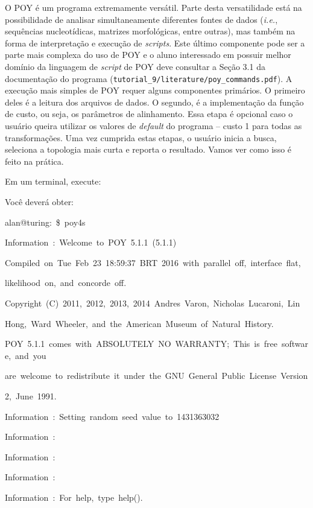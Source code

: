 \begin{refsection}
O POY é um programa extremamente versátil. Parte desta versatilidade está na possibilidade de analisar simultaneamente diferentes fontes de dados (\textit{i.e.}, sequências nucleotídicas, matrizes morfológicas, entre outras), mas também na forma de interpretação e execução de \textit{scripts}. Este último componente pode ser a parte mais complexa do uso de POY e o aluno interessado em possuir melhor domínio da linguagem de \textit{script} de POY deve consultar a Seção 3.1 da documentação do programa (\texttt{tutorial\_9/literature/poy\_commands.pdf}). A execução mais simples de POY requer alguns componentes primários. O primeiro deles é a leitura dos arquivos de dados. O segundo, é a implementação da função de custo, ou seja, os parâmetros de alinhamento. Essa etapa é opcional caso o usuário queira utilizar os valores de \textit{default} do programa -- custo 1 para todas as transformações. Uma vez cumprida estas etapas, o usuário inicia a busca, seleciona a topologia mais curta e reporta o resultado. Vamos ver como isso é feito na prática.

	Em um terminal, execute:


Você deverá obter:


\scriptsize

alan@turing:{~}\$~poy4s


Information~:~Welcome~to~POY~5.1.1~(5.1.1)

Compiled~on~Tue~Feb~23~18:59:37~BRT~2016~with~parallel~off,~interface~flat,

likelihood~on,~and~concorde~off.

Copyright~(C)~2011,~2012,~2013,~2014~Andres~Varon,~Nicholas~Lucaroni,~Lin

Hong,~Ward~Wheeler,~and~the~American~Museum~of~Natural~History.

POY~5.1.1~comes~with~ABSOLUTELY~NO~WARRANTY;~This~is~free~software,~and~you

are~welcome~to~redistribute~it~under~the~GNU~General~Public~License~Version

2,~June~1991.

\vspace{20pt}

Information~:~Setting~random~seed~value~to~1431363032

Information~:~

Information~:~

Information~:~

Information~:~For~help,~type~help().


\end{refsection}
